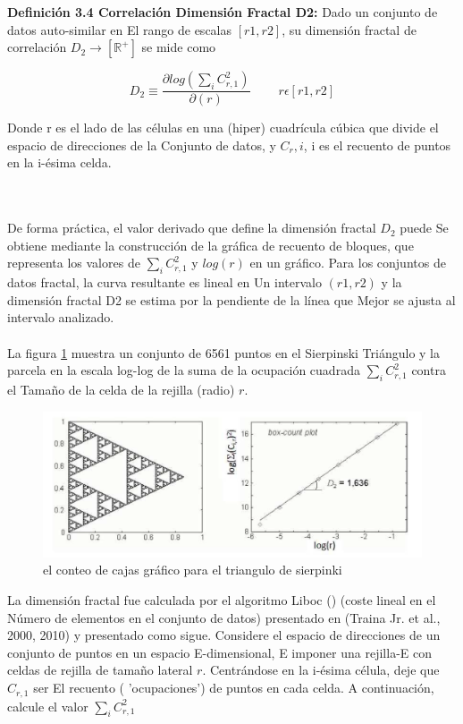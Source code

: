 \textbf{Definición 3.4 Correlación Dimensión Fractal D2:} Dado un conjunto de datos auto-similar en
El rango de escalas $[r1, r2]$, su dimensión fractal de correlación $D_2 \rightarrow \left[ \mathbb{R}^{+} \right]$ se mide como

\begin{equation}
D_2 \equiv  \frac{\partial log (\sum_i C_{r,1}^2)}{\partial (r)} \qquad \:r \epsilon [r1,r2 ]
\label{eq:ec2}
\end{equation}

Donde r es el lado de las células en una (hiper) cuadrícula cúbica que divide el espacio de direcciones de la
Conjunto de datos, y $C_r,i$, i es el recuento de puntos en la i-ésima celda.

\\\\
De forma práctica, el valor derivado que define la dimensión fractal $D_2$ puede
Se obtiene mediante la construcción de la gráfica de recuento de bloques, que representa los valores de
$\sum_i C_{r,1}^2$  y $log (r)$ en un gráfico. Para los conjuntos de datos fractal, la curva resultante es lineal en
Un intervalo $(r1, r2)$ y la dimensión fractal D2 se estima por la pendiente de la línea que
Mejor se ajusta al intervalo analizado.
\\\\
La figura \ref{fig:ima4} muestra un conjunto de 6561 puntos en el Sierpinski
Triángulo y la parcela en la escala log-log de la suma de la ocupación cuadrada $\sum_i C_{r,1}^2$ contra el
Tamaño de la celda de la rejilla (radio) $r$.

\begin{figure}[h]
\centering
\includegraphics[scale=1.2]{chapter4/ima4.png}
\caption{el conteo de cajas gráfico para el triangulo de sierpinki}
\label{fig:ima4}
\end{figure}

La dimensión fractal fue calculada por el algoritmo Liboc () (coste lineal en el
Número de elementos en el conjunto de datos) presentado en (Traina Jr. et al., 2000, 2010) y presentado como sigue. Considere el espacio de direcciones de un conjunto de puntos en un espacio E-dimensional,
E imponer una rejilla-E con celdas de rejilla de tamaño lateral $r$. Centrándose en la i-ésima célula, deje que $ C_{r,1}$ ser
El recuento ( 'ocupaciones') de puntos en cada celda. A continuación, calcule el valor $\sum_i C_{r,1}^2$

